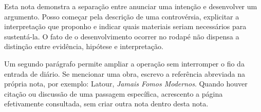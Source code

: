 Esta nota demonstra a separação entre anunciar uma intenção e desenvolver um argumento. Posso começar pela descrição de uma controvérsia, explicitar a interpretação que proponho e indicar quais materiais seriam necessários para sustentá-la. O fato de o desenvolvimento ocorrer no rodapé não dispensa a distinção entre evidência, hipótese e interpretação.

Um segundo parágrafo permite ampliar a operação sem interromper o fio da entrada de diário. Se mencionar uma obra, escrevo a referência abreviada na própria nota, por exemplo: Latour, \textit{Jamais Fomos Modernos}. Quando houver citação ou discussão de uma passagem específica, acrescento a página efetivamente consultada, sem criar outra nota dentro desta nota.
